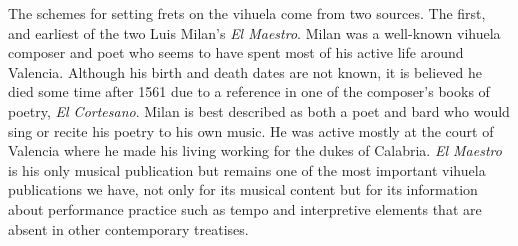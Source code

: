 The schemes for setting frets on the vihuela come from two sources. The first, and
earliest of the two Luis Milan's \textit{El Maestro}.  Milan was a well-known vihuela
composer and poet who seems to have spent most of his active life around Valencia.
Although his birth and death dates are not known, it is believed he died some time
after 1561 due to a reference in one of the composer's books of poetry, \textit{El
Cortesano}.\autocite[6]{LG:1}  Milan is best described as both a poet and bard who
would sing or recite his poetry to his own music.  He was active mostly at the court of
Valencia where he made his living working for the dukes of Calabria. \textit{El
Maestro} is his only musical publication but remains one of the most important vihuela
publications we have, not only for its musical content but for its information about
performance practice such as tempo and interpretive elements that are absent in
other contemporary treatises.


